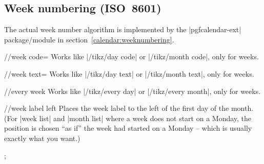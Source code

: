 \begin{multicols}{2}
\subsection{Week numbering (ISO~8601)}

The actual week number algorithm is implemented by the |pgfcalendar-ext| package/module in section~\ref{calendar:weeknumbering}.
\begin{key}{/\tikzext/week code=}
  Works like |/tikz/day code| or |/tikz/month code|, only for weeks.
\end{key}

\begin{key}{/\tikzext/week text=}
  Works like |/tikz/day text| or |/tikz/month text|, only for weeks.
\end{key}

\begin{stylekey}{/\tikzext/every week}
  Works like |/tikz/every day| or |/tikz/every month|, only for weeks.
\end{stylekey}

\begin{stylekey}{/\tikzext/week label left}
    Places the week label to the left of the first day of the month. (For
    |week list| and |month list| where a week does not start on a Monday, the
    position is chosen ``as if'' the week had started on a Monday --  which is
    usually exactly what you want.)
\begin{codeexample}[preamble={\usetikzlibrary{ext.calendar-plus}}]
\tikz
  \calendar[
    week list, month label above centered,
    dates=2022-07-01 to 2022-07-31,
    ext/week label left,
    ext/every week/.append style={
      gray!50!black, font=\sffamily}];
\end{codeexample}
\end{stylekey}

\end{multicols}
\endinput